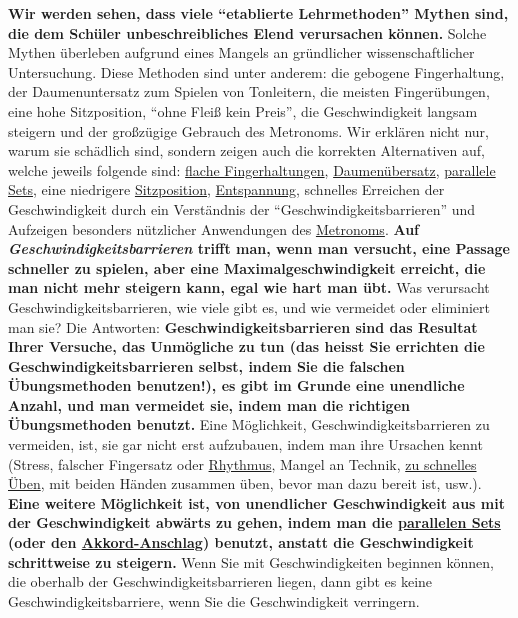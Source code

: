 \textbf{Wir werden sehen, dass viele \enquote{etablierte Lehrmethoden} Mythen sind, die dem Schüler unbeschreibliches Elend verursachen können.}
 Solche Mythen überleben aufgrund eines Mangels an gründlicher wissenschaftlicher Untersuchung.
 Diese Methoden sind unter anderem: die gebogene Fingerhaltung, der Daumenuntersatz zum Spielen von Tonleitern, die meisten Fingerübungen, eine hohe Sitzposition, \enquote{ohne Fleiß kein Preis}, die Geschwindigkeit langsam steigern und der großzügige Gebrauch des Metronoms.
 Wir erklären nicht nur, warum sie schädlich sind, sondern zeigen auch die korrekten Alternativen auf, welche jeweils folgende sind: \hyperlink{c1iii4b}{flache Fingerhaltungen}, \hyperlink{c1iii5a}{Daumenübersatz}, \hyperlink{c1ii11}{parallele Sets}, eine niedrigere \hyperlink{c1ii3}{Sitzposition}, \hyperlink{c1ii14}{Entspannung}, schnelles Erreichen der Geschwindigkeit durch ein Verständnis der \enquote{Geschwindigkeitsbarrieren} und Aufzeigen besonders nützlicher Anwendungen des \hyperlink{c1ii19}{Metronoms}.
 \textbf{Auf \textit{Geschwindigkeitsbarrieren} trifft man, wenn man versucht, eine Passage schneller zu spielen, aber eine Maximalgeschwindigkeit erreicht, die man nicht mehr steigern kann, egal wie hart man übt.}
 Was verursacht Geschwindigkeitsbarrieren, wie viele gibt es, und wie vermeidet oder eliminiert man sie?
 Die Antworten: \textbf{Geschwindigkeitsbarrieren sind das Resultat Ihrer Versuche, das Unmögliche zu tun (das heisst Sie errichten die Geschwindigkeitsbarrieren selbst, indem Sie die falschen Übungsmethoden benutzen!), es gibt im Grunde eine unendliche Anzahl, und man vermeidet sie, indem man die richtigen Übungsmethoden benutzt.}
 Eine Möglichkeit, Geschwindigkeitsbarrieren zu vermeiden, ist, sie gar nicht erst aufzubauen, indem man ihre Ursachen kennt (Stress, falscher Fingersatz oder \hyperlink{c1iii1b}{Rhythmus}, Mangel an Technik, \hyperlink{c1ii13}{zu schnelles Üben}, mit beiden Händen zusammen üben, bevor man dazu bereit ist, usw.).
 \textbf{Eine weitere Möglichkeit ist, von unendlicher Geschwindigkeit aus mit der Geschwindigkeit abwärts zu gehen, indem man die \hyperlink{c1ii11}{parallelen Sets} (oder den \hyperlink{c1ii9}{Akkord-Anschlag}) benutzt, anstatt die Geschwindigkeit schrittweise zu steigern.}
 Wenn Sie mit Geschwindigkeiten beginnen können, die oberhalb der Geschwindigkeitsbarrieren liegen, dann gibt es keine Geschwindigkeitsbarriere, wenn Sie die Geschwindigkeit verringern.
 

